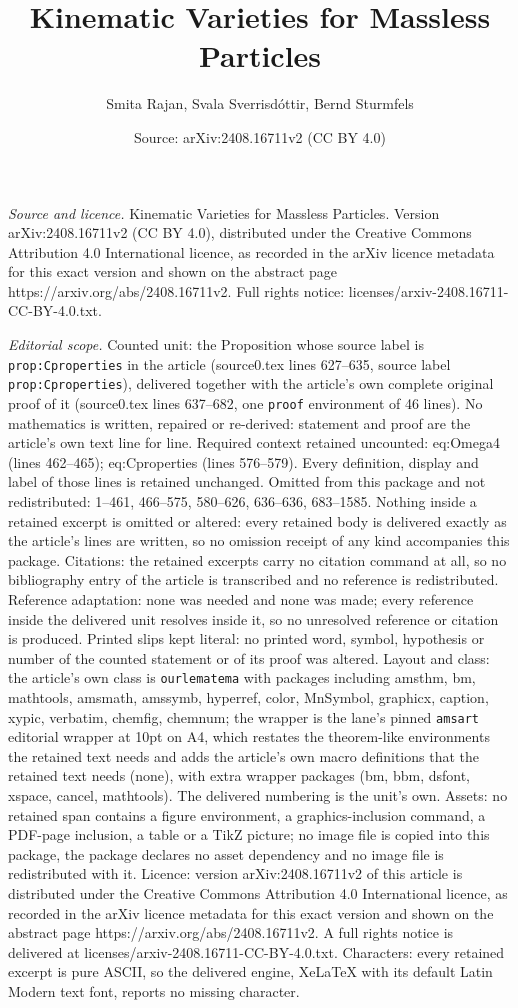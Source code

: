 \documentclass[10pt,a4paper]{amsart}
\title[Kinematic Varieties for Massless Particles]{Kinematic Varieties for Massless Particles}
\author{Smita Rajan, Svala Sverrisd\'ottir, Bernd Sturmfels}
\date{Source: arXiv:2408.16711v2 (CC BY 4.0)}
\begin{document}
\maketitle

\noindent\emph{Source and licence.} Kinematic Varieties for Massless Particles. Version arXiv:2408.16711v2 (CC BY 4.0), distributed under the Creative Commons Attribution 4.0 International licence, as recorded in the arXiv licence metadata for this exact version and shown on the abstract page https://arxiv.org/abs/2408.16711v2. Full rights notice: licenses/arxiv-2408.16711-CC-BY-4.0.txt.\par\smallskip

\noindent\textit{Editorial scope.} Counted unit: the Proposition whose source label is \texttt{prop:Cproperties} in the article (source0.tex lines 627--635, source label \texttt{prop:Cproperties}), delivered together with the article's own complete original proof of it (source0.tex lines 637--682, one \texttt{proof} environment of 46 lines). No mathematics is written, repaired or re-derived: statement and proof are the article's own text line for line. Required context retained uncounted: eq:Omega4 (lines 462--465); eq:Cproperties (lines 576--579). Every definition, display and label of those lines is retained unchanged. Omitted from this package and not redistributed: 1--461, 466--575, 580--626, 636--636, 683--1585. Nothing inside a retained excerpt is omitted or altered: every retained body is delivered exactly as the article's lines are written, so no omission receipt of any kind accompanies this package. Citations: the retained excerpts carry no citation command at all, so no bibliography entry of the article is transcribed and no reference is redistributed. Reference adaptation: none was needed and none was made; every reference inside the delivered unit resolves inside it, so no unresolved reference or citation is produced. Printed slips kept literal: no printed word, symbol, hypothesis or number of the counted statement or of its proof was altered. Layout and class: the article's own class is \texttt{ourlematema} with packages including amsthm, bm, mathtools, amsmath, amssymb, hyperref, color, MnSymbol, graphicx, caption, xypic, verbatim, chemfig, chemnum; the wrapper is the lane's pinned \texttt{amsart} editorial wrapper at 10pt on A4, which restates the theorem-like environments the retained text needs and adds the article's own macro definitions that the retained text needs (none), with extra wrapper packages (bm, bbm, dsfont, xspace, cancel, mathtools). The delivered numbering is the unit's own. Assets: no retained span contains a figure environment, a graphics-inclusion command, a PDF-page inclusion, a table or a TikZ picture; no image file is copied into this package, the package declares no asset dependency and no image file is redistributed with it. Licence: version arXiv:2408.16711v2 of this article is distributed under the Creative Commons Attribution 4.0 International licence, as recorded in the arXiv licence metadata for this exact version and shown on the abstract page https://arxiv.org/abs/2408.16711v2. A full rights notice is delivered at licenses/arxiv-2408.16711-CC-BY-4.0.txt. Characters: every retained excerpt is pure ASCII, so the delivered engine, XeLaTeX with its default Latin Modern text font, reports no missing character.
\end{document}

